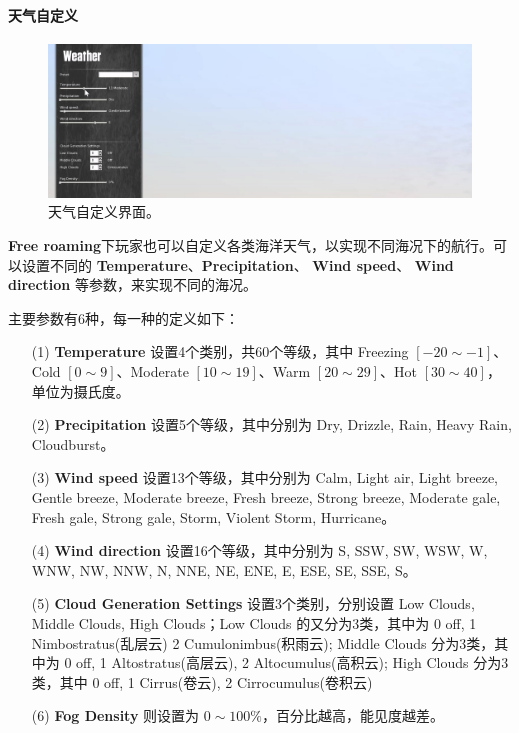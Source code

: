 \documentclass[letterpaper,10pt]{article}
\begin{document}
				\paragraph{天气自定义}
				
				\begin{figure}[htbp]
					\centering 
					\includegraphics[width=0.7\columnwidth]{picture/Weather}
					\caption{
						\label{fig: Weather} 
						天气自定义界面。
					}	
				\end{figure}
				
				\textbf{Free roaming}下玩家也可以自定义各类海洋天气，以实现不同海况下的航行。可以设置不同的 \textbf{Temperature}、\textbf{Precipitation}、 \textbf{Wind speed}、 \textbf{Wind direction} 等参数，来实现不同的海况。
				
				
				主要参数有6种，每一种的定义如下：
				\begin{itemize}
					\item [(1)] 
					\textbf{Temperature} 设置4个类别，共60个等级，其中 Freezing $[-20 \sim -1]$、Cold $[0 \sim 9]$、Moderate $[10 \sim 19]$、Warm $[20 \sim 29]$、Hot $[30 \sim 40]$，单位为摄氏度。
					
					\item [(2)]
					\textbf{Precipitation} 设置5个等级，其中分别为 Dry, Drizzle, Rain, Heavy Rain, Cloudburst。
					
					\item [(3)]
					\textbf{Wind speed} 设置13个等级，其中分别为 Calm, Light air, Light breeze, Gentle breeze, Moderate breeze, Fresh breeze, Strong breeze, Moderate gale, Fresh gale, Strong gale, Storm, Violent Storm, Hurricane。
					
					\item [(4)]
					\textbf{Wind direction} 设置16个等级，其中分别为 S, SSW, SW, WSW, W, WNW, NW, NNW, N, NNE, NE, ENE, E, ESE, SE, SSE, S。
					
					\item [(5)]
					\textbf{Cloud Generation Settings} 设置3个类别，分别设置 Low Clouds, Middle Clouds, High Clouds；Low Clouds 的又分为3类，其中为 0 off, 1 Nimbostratus(乱层云) 2 Cumulonimbus(积雨云); Middle Clouds 分为3类，其中为 0 off, 1 Altostratus(高层云), 2 Altocumulus(高积云); High Clouds 分为3类，其中 0 off, 1 Cirrus(卷云), 2 Cirrocumulus(卷积云)
					
					\item [(6)]
					\textbf{Fog Density} 则设置为 $0 \sim 100\%$，百分比越高，能见度越差。
				\end{itemize}
	
\end{document}
